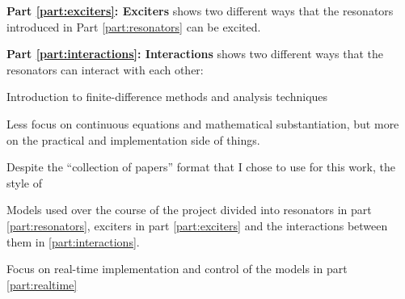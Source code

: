 \textbf{Part \ref{part:exciters}: Exciters} shows two different ways that the resonators introduced in Part \ref{part:resonators} can be excited. 

\textbf{Part \ref{part:interactions}: Interactions} shows two different ways that the resonators can interact with each other: 


Introduction to finite-difference methods and analysis techniques

Less focus on continuous equations and mathematical substantiation, but more on the practical and implementation side of things.

Despite the ``collection of papers'' format that I chose to use for this work, the style of  

Models used over the course of the project divided into resonators in part \ref{part:resonators}, exciters in part \ref{part:exciters} and the interactions between them in \ref{part:interactions}.

Focus on real-time implementation and control of the models in part \ref{part:realtime}